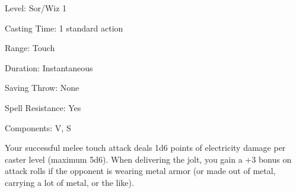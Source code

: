 
\begin{description*}
\item[Level:] Sor/Wiz 1
\item[Casting Time:] 1 standard action
\item[Range:] Touch
\item[Duration:] Instantaneous
\item[Saving Throw:] None
\item[Spell Resistance:] Yes
\item[Components:] V, S
\end{description*}

Your successful melee touch attack deals 1d6 points of electricity damage per caster
level (maximum 5d6). When delivering the jolt, you gain a +3 bonus on attack rolls
if the opponent is wearing metal armor (or made out of metal, carrying a lot of
metal, or the like).